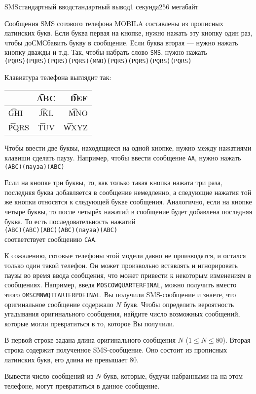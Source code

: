 \begin{problem}{SMS}{стандартный ввод}{стандартный вывод}{1 секунда}{256 мегабайт}

Сообщения SMS сотового телефона MOBILA составлены из прописных латинских букв.
Если буква первая на кнопке, нужно нажать эту кнопку один раз,
чтобы доСМСбавить букву в сообщение. Если буква вторая --- нужно нажать кнопку дважды и т.д.
Так, чтобы набрать слово \texttt{SMS}, нужно нажать \\
\texttt{(PQRS)(PQRS)(PQRS)(PQRS)(MNO)(PQRS)(PQRS)(PQRS)(PQRS)}

Клавиатура телефона выглядит так:

\begin{tabular}{ | l | c | r | }
\hline
& \t{ABC} & \t{DEF} \\ \hline
\t{GHI} & \t{JKL} & \t{MNO} \\ \hline
\t{PQRS} & \t{TUV} & \t{WXYZ} \\ \hline
\end{tabular}

Чтобы ввести две буквы, находящиеся на одной кнопке,
нужно между нажатиями клавиши сделать паузу.
Например, чтобы ввести сообщение \texttt{AA}, нужно нажать \\
\texttt{(ABC)(пауза)(ABC)}

Если на кнопке три буквы, то, как только такая кнопка нажата три раза,
последняя буква добавляется в сообщение немедленно, а следующие нажатия
той же кнопки относятся к следующей букве сообщения. Аналогично,
если на кнопке четыре буквы, то после четырёх нажатий в сообщение
будет добавлена последняя буква. То есть последовательность нажатий \\
\texttt{(ABC)(ABC)(ABC)(ABC)(пауза)(ABC)} \\
соответствует сообщению \texttt{CAA}.

К сожалению, сотовые телефоны этой модели давно не производятся,
и остался только один такой телефон. Он может произвольно вставлять
и игнорировать паузы во время ввода сообщения, что может привести к
некоторым изменениям в сообщениях. Например, введя \texttt{MOSCOWQUARTERFINAL},
можно получить вместо этого \texttt{OMSCMNWQTTARTERPDEINAL}.
Вы получили SMS-сообщение и знаете, что оригинальное сообщение содержало $N$ букв. Чтобы определить вероятность угадывания оригинального сообщения, найдите число возможных сообщений, которые могли превратиться в то, которое Вы получили.


\InputFile
В первой строке задана длина оригинального сообщения $N$ ($1 \le N \le 80$).
Вторая строка содержит полученное SMS-сообщение.
Оно состоит из прописных латинских букв, его длина не превышает 80.


\OutputFile
Вывести число сообщений из $N$ букв, которые, будучи набранными на на этом
телефоне, могут превратиться в данное сообщение.

\Examples

\begin{example}
%
%
%
\end{example}

\end{problem}

